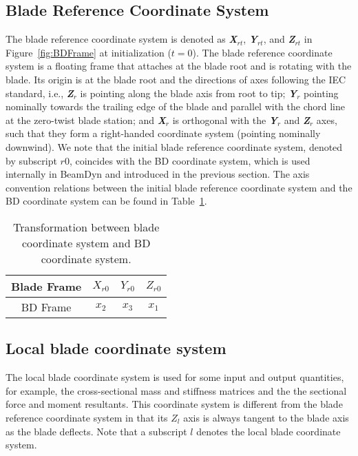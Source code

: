 \subsection{Blade Reference Coordinate System}
The blade reference coordinate system is denoted as \textbf{ {\it X$_{rt}$}}, \textbf{ {\it Y$_{rt}$}}, and \textbf{ {\it Z$_{rt}$}} in Figure~\ref{fig:BDFrame} at initialization ($t = 0$). 
The blade reference coordinate system is a floating frame that attaches at the blade root and is rotating with the blade. 
Its origin is at the blade root and the directions of axes following the IEC standard, i.e., \textbf{ {\it Z$_r$}} is pointing along the blade axis from root to tip; \textbf{ {\it Y$_r$}} pointing nominally towards the trailing edge of the blade and parallel with the chord line at the zero-twist blade station; and \textbf{ {\it X$_r$}} is orthogonal with the \textbf{ {\it Y$_r$}} and \textbf{ {\it Z$_r$}} axes, such that they form a right-handed coordinate system (pointing nominally downwind). 
We note that the initial blade reference coordinate system, denoted by subscript $r0$, coincides with the BD coordinate system, which is used internally in BeamDyn and introduced in the previous section. 
The axis convention relations between the initial blade reference coordinate system and the BD coordinate system can be found in Table~\ref{tab:IECBD}. 

\begin{table}
\centering
\caption{Transformation between blade coordinate system and BD coordinate system.}
 \label{tab:IECBD}
 \begin{tabular}{| c | c | c | c |}
     \hline
    Blade Frame & $X_{r0}$ & $Y_{r0}$ & $Z_{r0}$ \\ \hline
    BD Frame     & $x_2$ & $x_3$ & $x_1$ \\
    \hline
\end{tabular}
\end{table}

\subsection{Local blade coordinate system}
The local blade coordinate system is used for some input and output quantities, for example, the cross-sectional mass and stiffness matrices and the the sectional force and moment resultants. This coordinate system is different from the blade reference coordinate system in that its $Z_l$ axis is always tangent to the blade axis as the blade deflects. Note that a subscript $l$ denotes the local blade coordinate system.

